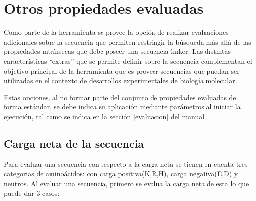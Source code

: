 \section{Otros propiedades evaluadas}

Como parte de la herramienta se provee la opción de realizar evaluaciones adicionales sobre la secuencia que permiten restringir la búsqueda más allá de las propiedades intrínsecas que debe poseer una secuencia linker.
Las distintas características ``extras'' que se permite definir sobre la secuencia complementan el objetivo principal de la herramienta que es proveer secuencias que puedan ser utilizadas 
en el contexto de desarrollos experimentales de biología molecular.

Estas opciones, al no formar parte del conjunto de propiedades evaluadas de forma estándar, se debe indica su aplicación mediante parámetros al iniciar la ejecución, tal como se indica en la sección \ref{evaluacion} del manual.

\subsection{Carga neta de la secuencia}


Para evaluar una secuencia con respecto a la carga neta se tienen en cuenta tres categorias de aminoácidos: con carga positiva(K,R,H), carga negativa(E,D) y neutros.
Al evaluar una secuencia, primero se evalua la carga neta de esta lo que puede dar 3 casos:

